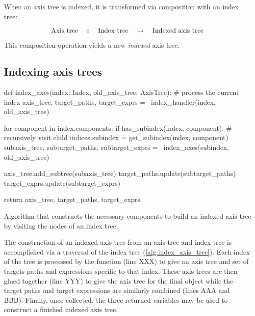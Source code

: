 \documentclass[thesis]{subfiles}
\begin{document}
When an axis tree is indexed, it is transformed via composition with an index tree:

\begin{equation*}
  \textnormal{Axis tree} \quad \circ \quad \textnormal{Index tree} \quad \to \quad \textnormal{Indexed axis tree}
\end{equation*}

This composition operation yields a new \textit{indexed} axis tree.

\subsection{Indexing axis trees}

\begin{algorithm}
  \begin{pyalg2}
    def index_axes(index: Index, old_axis_tree: AxisTree):
      # process the current index
      axis_tree, target_paths, target_exprs = \
        index_handler(index, old_axis_tree)

      for component in index.components:
        if has_subindex(index, component):
          # recursively visit child indices
          subindex = get_subindex(index, component)
          subaxis_tree, subtarget_paths, subtarget_exprs = \
            index_axes(subindex, old_axis_tree)

          axis_tree.add_subtree(subaxis_tree)
          target_paths.update(subtarget_paths)
          target_exprs.update(subtarget_exprs)

      return axis_tree, target_paths, target_exprs
  \end{pyalg2}

  \caption{
    Algorithm that constructs the necessary components to build an indexed axis tree by visiting the nodes of an index tree.
  }
  \label{alg:index_axis_tree}
\end{algorithm}

The construction of an indexed axis tree from an axis tree and index tree is accomplished via a traversal of the index tree (\cref{alg:index_axis_tree}).
Each index of the tree is processed by the function  (line XXX) to give an axis tree and set of targets paths and expressions specific to that index.
These axis trees are then glued together (line YYY) to give the axis tree for the final object while the target paths and target expressions are similarly combined (lines AAA and BBB).
Finally, once collected, the three returned variables may be used to construct a finished indexed axis tree.
\end{document}
